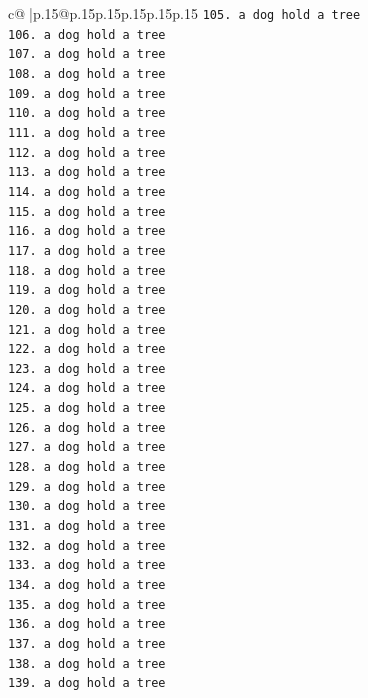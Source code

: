 \documentclass{article}
\begin{document}
{\begin{supertabular}{c@{$\;$}|p{.15\linewidth}@{}p{.15\linewidth}p{.15\linewidth}p{.15\linewidth}p{.15\linewidth}p{.15\linewidth}}
{{{\texttt{105. a dog hold a tree} \\
\texttt{106. a dog hold a tree} \\
\texttt{107. a dog hold a tree} \\
\texttt{108. a dog hold a tree} \\
\texttt{109. a dog hold a tree} \\
\texttt{110. a dog hold a tree} \\
\texttt{111. a dog hold a tree} \\
\texttt{112. a dog hold a tree} \\
\texttt{113. a dog hold a tree} \\
\texttt{114. a dog hold a tree} \\
\texttt{115. a dog hold a tree} \\
\texttt{116. a dog hold a tree} \\
\texttt{117. a dog hold a tree} \\
\texttt{118. a dog hold a tree} \\
\texttt{119. a dog hold a tree} \\
\texttt{120. a dog hold a tree} \\
\texttt{121. a dog hold a tree} \\
\texttt{122. a dog hold a tree} \\
\texttt{123. a dog hold a tree} \\
\texttt{124. a dog hold a tree} \\
\texttt{125. a dog hold a tree} \\
\texttt{126. a dog hold a tree} \\
\texttt{127. a dog hold a tree} \\
\texttt{128. a dog hold a tree} \\
\texttt{129. a dog hold a tree} \\
\texttt{130. a dog hold a tree} \\
\texttt{131. a dog hold a tree} \\
\texttt{132. a dog hold a tree} \\
\texttt{133. a dog hold a tree} \\
\texttt{134. a dog hold a tree} \\
\texttt{135. a dog hold a tree} \\
\texttt{136. a dog hold a tree} \\
\texttt{137. a dog hold a tree} \\
\texttt{138. a dog hold a tree} \\
\texttt{139. a dog hold a tree} \\
}}}
\end{supertabular}}
\end{document}
